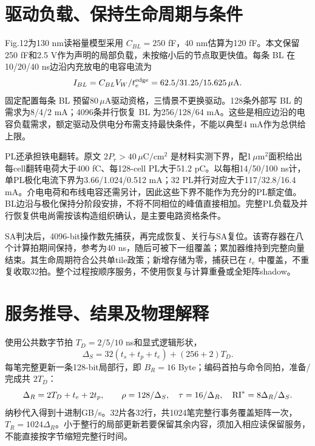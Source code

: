 \section{驱动负载、保持生命周期与条件}

 Fig.12为130 nm读裕量模型采用 $C_{BL}=250$ fF，40 nm估算为120 fF。本文保留250 fF和2.5 V作为声明的局部负载，未按缩小后的节点取更快值。每条 BL 在10/20/40 ns边沿内充放电的电容电流为
\[
I_{BL}=C_{BL}V_W/t_e^{\rm edge}=62.5/31.25/15.625\,\mu\mathrm{A}.
\]
固定配置每条 BL 预留80\,$\mu$A驱动资格，三情景不更换驱动。128条外部写 BL 的需求为8/4/2 mA；4096条并行恢复 BL 为256/128/64 mA。这些是相应边沿的电容负载需求，额定驱动及供电分布需支持最快条件，不能以典型4 mA作为总供给上限。

PL还承担铁电翻转。原文 $2P_r>40\,\mu\mathrm{C/cm^2}$ 是材料实测下界，配1\,$\mu$m$^2$面积给出每cell翻转电荷大于400 fC、每128-cell PL大于51.2 pC。以每相14/50/100 ns计，单PL极化电流下界为3.66/1.024/0.512 mA；32 PL并行对应大于117/32.8/16.4 mA。介电电荷和布线电容还需另计，因此这些下界不能作为充分的PL额定值。BL边沿与极化保持分阶段安排，不将不同相位的峰值直接相加。完整PL负载及并行恢复供电尚需按该构造组织确认，是主要电路资格条件。

SA判决后，4096-bit操作数先捕获，再完成恢复、关行与SA复位。该寄存器在八个计算拍期间保持，参考为40 ns，随后可被下一组覆盖；累加器维持到完整向量结束。其生命周期符合公共单tile政策；新增存储为零，捕获已在 $t_e$ 中覆盖，不重复收取32拍。整个过程按顺序服务，不使用恢复与计算重叠或全矩阵shadow。

\section{服务推导、结果及物理解释}

使用公共数字节拍 $T_D=2/5/10$ ns和显式逻辑形状，
\begin{equation}
\Delta_S=32(t_s+t_p+t_e)+(256+2)T_D.
\label{08_feram_hfo2:eq:stream}
\end{equation}
每笔完整更新一条128-bit局部行，即 $B_R=16$ Byte；编码首拍与命令同拍，准备/完成共 $2T_D$：
\begin{equation}
\Delta_R=2T_D+t_e+2t_p,\qquad
\rho=128/\Delta_S,\quad\tau=16/\Delta_R,\quad\mathrm{RI}^*=8\Delta_R/\Delta_S.
\label{08_feram_hfo2:eq:resident}
\end{equation}
纳秒代入得到十进制GB/s。32片各32行，共1024笔完整行事务覆盖矩阵一次，$T_R=1024\Delta_R$。小于整行的局部更新若要保留其余内容，须加入相应读保留服务，不能直接按字节缩短完整行时间。

\begingroup
\let\feramresulttable\table
\renewcommand{\table}[1][htbp]{\feramresulttable[H]}

\endgroup

